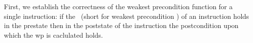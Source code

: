 

First, we establish the correctness of the weakest precondition function for a single instruction: if the \fwpi \ (short for weakest precondition ) of an 
instruction holds in the prestate then in the poststate of the instruction the postcondition upon which the wp is caclulated holds. 



